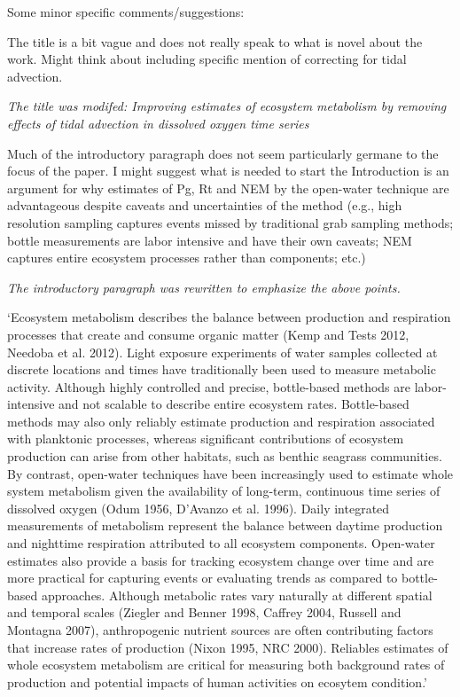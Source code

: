 \documentclass[letterpaper,12pt]{article}\usepackage[]{graphicx}\usepackage[]{color}
\begin{document}
Some minor specific comments/suggestions:

The title is a bit vague and does not really speak to what is novel about the work. Might think about including specific mention of correcting for tidal advection.

{\it The title was modifed: Improving estimates of ecosystem metabolism by removing effects of tidal advection in dissolved oxygen time series}

Much of the introductory paragraph does not seem particularly germane to the focus of the paper. I might suggest what is needed to start the Introduction is an argument for why estimates of Pg, Rt and NEM by the open-water technique are advantageous despite caveats and uncertainties of the method (e.g., high resolution sampling captures events missed by traditional grab sampling methods; bottle measurements are labor intensive and have their own caveats; NEM captures entire ecosystem processes rather than components; etc.)

{\it The introductory paragraph was rewritten to emphasize the above points.

`Ecosystem metabolism describes the balance between production and respiration processes that create and consume organic matter (Kemp and Tests 2012, Needoba et al. 2012).  Light exposure experiments of water samples collected at discrete locations and times have traditionally been used to measure metabolic activity.  Although highly controlled and precise, bottle-based methods are labor-intensive and not scalable to describe entire ecosystem rates.  Bottle-based methods may also only reliably estimate production and respiration associated with planktonic processes, whereas significant contributions of ecosystem production can arise from other habitats, such as benthic seagrass communities.  By contrast, open-water techniques have been increasingly used to estimate whole system metabolism given the availability of long-term, continuous time series of dissolved oxygen (Odum 1956, D'Avanzo et al. 1996). Daily integrated measurements of metabolism represent the balance between daytime production and nighttime respiration attributed to all ecosystem components.  Open-water estimates also provide a basis for tracking ecosystem change over time and are more practical for capturing events or evaluating trends as compared to bottle-based approaches. Although metabolic rates vary naturally at different spatial and temporal scales (Ziegler and Benner 1998, Caffrey 2004, Russell and Montagna 2007), anthropogenic nutrient sources are often contributing factors that increase rates of production (Nixon 1995, NRC 2000).  Reliables estimates of whole ecosystem metabolism are critical for measuring both background rates of production and potential impacts of human activities on ecosytem condition.'
}
\end{document}
